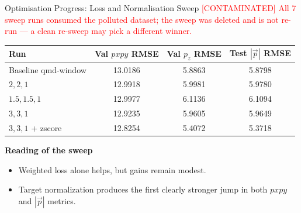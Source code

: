 \documentclass[11pt]{beamer}
\begin{document}
\begin{frame}{Optimisation Progress: Loss and Normalisation Sweep \textcolor{red}{[CONTAMINATED]}}
\small
\textcolor{red}{All 7 sweep runs consumed the polluted dataset; the sweep was
deleted and is not re-run --- a clean re-sweep may pick a different winner.}
\begin{table}
\centering
\begin{tabular}{lccc}
\toprule
Run & Val \(pxpy\) RMSE & Val \(p_z\) RMSE & Test \(|\vec p|\) RMSE \\
\midrule
Baseline qmd-window & 13.0186 & 5.8863 & 5.8798 \\
\(2,2,1\) & 12.9918 & 5.9981 & 5.9780 \\
\(1.5,1.5,1\) & 12.9977 & 6.1136 & 6.1094 \\
\(3,3,1\) & 12.9235 & 5.9605 & 5.9649 \\
\(3,3,1\) + zscore & 12.8254 & 5.4072 & 5.3718 \\
\bottomrule
\end{tabular}
\end{table}

\textbf{Reading of the sweep}
\begin{itemize}
\item Weighted loss alone helps, but gains remain modest.
\item Target normalization produces the first clearly stronger jump in both \(pxpy\) and \(|\vec p|\) metrics.
\end{itemize}
\end{frame}
\end{document}
